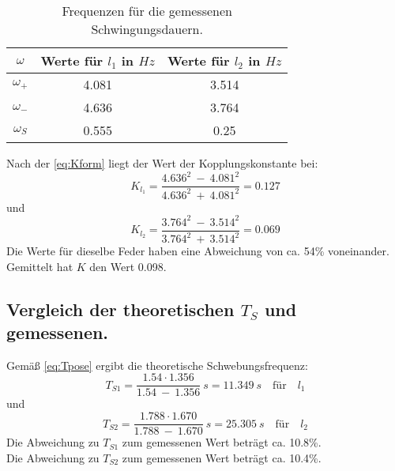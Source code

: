 \begin{table}
  \centering
  \caption{Frequenzen für die gemessenen Schwingungsdauern.}
  \begin{tabular}{c c c}
    \toprule
    $\omega$ & Werte für $l_1$ in $Hz$ & Werte für $l_2$ in $Hz$\\
    \midrule
    $\omega_+$ & 4.081 & 3.514\\
    $\omega_-$ & 4.636 & 3.764\\
    $\omega_S$ & 0.555 & 0.25\\
  \end{tabular}
  \label{lab:omgtab}
\end{table}

Nach der \autoref{eq:Kform} liegt der Wert der Kopplungskonstante bei:
\begin{equation}
  K_{l_1} = \frac{4.636^2\ -\ 4.081^2}{4.636^2\ +\ 4.081^2} = 0.127
\end{equation}
und
\begin{equation}
  K_{l_2} = \frac{3.764^2\ -\ 3.514^2}{3.764^2\ +\ 3.514^2} = 0.069
\end{equation}
Die Werte für dieselbe Feder haben eine Abweichung von ca. 54\% voneinander.\\
Gemittelt hat $K$ den Wert 0.098.

\subsection{Vergleich der theoretischen $T_S$ und gemessenen.}
Gemäß \autoref{eq:Tpose} ergibt die theoretische Schwebungsfrequenz:
\begin{equation}
  T_{S1} = \frac{1.54\cdot 1.356}{1.54\ -\ 1.356}\ s = 11.349\ s \quad\textrm{für}\quad l_1
\end{equation}
und
\begin{equation}
  T_{S2} = \frac{1.788\cdot 1.670}{1.788\ -\ 1.670}\ s = 25.305\ s \quad\textrm{für}\quad l_2
\end{equation}
Die Abweichung zu $T_{S1}$ zum gemessenen Wert beträgt ca. 10.8\%.\\
Die Abweichung zu $T_{S2}$ zum gemessenen Wert beträgt ca. 10.4\%.\\